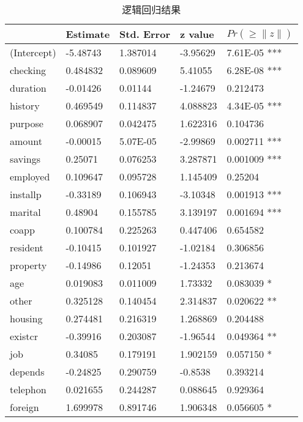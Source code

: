 \begin{table}[htbp]
  \centering
    \caption{\label{tab:logit}逻辑回归结果}
    \begin{tabular}{lllll}
    \toprule
          & Estimate & Std. Error & z value & $Pr(\ge\|z\|)$ \\
    \midrule
    (Intercept) & -5.48743 & 1.387014 & -3.95629 & 7.61E-05 ***\\
    checking & 0.484832 & 0.089609 & 5.41055 & 6.28E-08 ***\\
    duration & -0.01426 & 0.01144 & -1.24679 & 0.212473 \\
    history & 0.469549 & 0.114837 & 4.088823 & 4.34E-05 ***\\
    purpose & 0.068907 & 0.042475 & 1.622316 & 0.104736 \\
    amount & -0.00015 & 5.07E-05 & -2.99869 & 0.002711 ***\\
    savings & 0.25071 & 0.076253 & 3.287871 & 0.001009 ***\\
    employed & 0.109647 & 0.095728 & 1.145409 & 0.25204 \\
    installp & -0.33189 & 0.106943 & -3.10348 & 0.001913 ***\\
    marital & 0.48904 & 0.155785 & 3.139197 & 0.001694 ***\\
    coapp & 0.100784 & 0.225263 & 0.447406 & 0.654582 \\
    resident & -0.10415 & 0.101927 & -1.02184 & 0.306856 \\
    property & -0.14986 & 0.12051 & -1.24353 & 0.213674 \\
    age   & 0.019083 & 0.011009 & 1.73332 & 0.083039 *\\
    other & 0.325128 & 0.140454 & 2.314837 & 0.020622 **\\
    housing & 0.274481 & 0.216319 & 1.268869 & 0.204488 \\
    existcr & -0.39916 & 0.203087 & -1.96544 & 0.049364 **\\
    job   & 0.34085 & 0.179191 & 1.902159 & 0.057150 *\\
    depends & -0.24825 & 0.290759 & -0.8538 & 0.393214 \\
    telephon & 0.021655 & 0.244287 & 0.088645 & 0.929364 \\
    foreign & 1.699978 & 0.891746 & 1.906348 & 0.056605 *\\
    \bottomrule
    \end{tabular}%
  \label{tab:logit}%
\end{table}%

